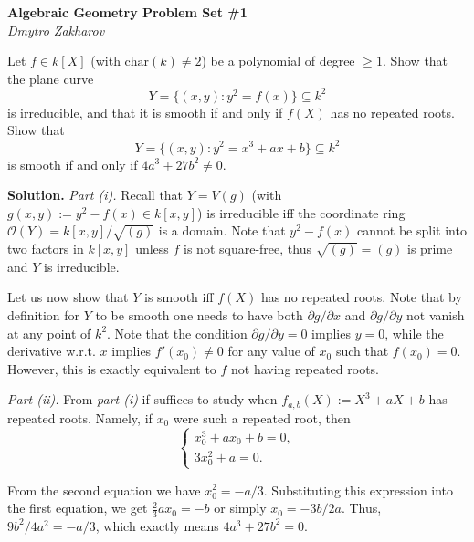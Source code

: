 \documentclass{template}
\begin{document}
\begin{center}
    \Large \textcolor{blue!70!black}{\textbf{Algebraic Geometry Problem Set \#1}} \\
    \normalsize \textit{Dmytro Zakharov}
\end{center}

\begin{problem}[Exercise 1]
    Let $f \in k[X]$ (with $\text{char}(k) \neq 2$) be a polynomial of degree $\geq 1$.
    Show that the plane curve
    \begin{equation*}
        Y = \{(x,y): y^2 = f(x)\} \subseteq k^2
    \end{equation*}
    is irreducible, and that it is smooth if and only if $f(X)$ has no repeated 
    roots. Show that
    \begin{equation*}
        Y = \{(x,y): y^2 = x^3 + ax + b\} \subseteq k^2
    \end{equation*}
    is smooth if and only if $4a^3+27b^2 \neq 0$.
\end{problem}

\textbf{Solution.} \textit{Part (i).} Recall that $Y=V(g)$ (with $g(x,y) :=
y^2-f(x) \in k[x,y]$) is irreducible iff the coordinate ring $\mathcal{O}(Y) =
k[x,y]/\sqrt{(g)}$ is a domain. Note that $y^2-f(x)$ cannot be split into two
factors in $k[x,y]$ unless $f$ is not square-free, thus $\sqrt{(g)} = (g)$ is
prime and $Y$ is irreducible.

Let us now show that $Y$ is smooth iff $f(X)$ has no repeated roots. Note that
by definition for $Y$ to be smooth one needs to have both $\partial g/\partial
x$ and $\partial g/\partial y$ not vanish at any point of $k^2$. Note that the
condition $\partial g/\partial y=0$ implies $y=0$, while the derivative w.r.t.
$x$ implies $f'(x_0) \neq 0$ for any value of $x_0$ such that $f(x_0)=0$.
However, this is exactly equivalent to $f$ not having repeated roots.

\textit{Part (ii).} From \textit{part (i)} if suffices to study when $f_{a,b}(X)
:= X^3 + aX + b$ has repeated roots. Namely, if $x_0$ were such a repeated root,
then
\begin{equation*}
    \begin{cases}
        x_0^3 + ax_0 + b = 0, \\
        3x_0^2 + a = 0.
    \end{cases}
\end{equation*}

From the second equation we have $x_0^2 = -a/3$. Substituting this expression
into the first equation, we get $\frac{2}{3}ax_0 = -b$ or simply $x_0 = -3b/2a$.
Thus, $9b^2/4a^2 = -a/3$, which exactly means $4a^3+27b^2=0$.
\end{document}
